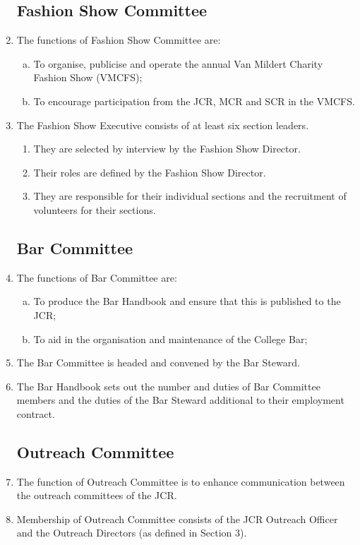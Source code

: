 \documentclass[12pt]{article}  %
\begin{document}
\begin{enumerate}
    \subsection{Fashion Show Committee}
    \item The functions of Fashion Show Committee are:
    \begin{enumerate}[(a)]
        \item To organise, publicise and operate the annual Van Mildert Charity Fashion Show (VMCFS);
        \item To encourage participation from the JCR, MCR and SCR in the VMCFS.
    \end{enumerate}
    \item The Fashion Show Executive consists of at least six section leaders.
    \begin{enumerate}
        \item They are selected by interview by the Fashion Show Director.
        \item Their roles are defined by the Fashion Show Director.
        \item They are responsible for their individual sections and the recruitment of volunteers for their sections.
    \end{enumerate}
    \subsection{Bar Committee}
    \item The functions of Bar Committee are:
    \begin{enumerate}[(a)]
        \item To produce the Bar Handbook and ensure that this is published to the JCR;
        \item To aid in the organisation and maintenance of the College Bar;
    \end{enumerate}
    \item The Bar Committee is headed and convened by the Bar Steward.
    \item The Bar Handbook sets out the number and duties of Bar Committee members and the duties of the Bar Steward additional to their employment contract.
    \subsection{Outreach Committee}
    \item The function of Outreach Committee is to enhance communication between the outreach committees of the JCR.
    \item Membership of Outreach Committee consists of the JCR Outreach Officer and the Outreach Directors (as defined in Section 3). 

\end{enumerate}
\end{document}
